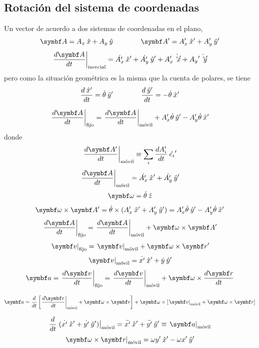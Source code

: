 \documentclass[10pt,oneside]{CBFT_book}
\begin{document}
\subsection{Rotación del sistema de coordenadas}

Un vector de acuerdo a dos sistemas de coordenadas en el plano,
\[
	\vb{A} = A_x\xver + A_y\yver \qquad \qquad \vb{A}' = A_x'\xver' + A_y'\yver'
\]
\[
	\left. \dtot{\vb{A}}{t} \right|_\text{inercial} = 
	\dot{A_x'}\xver' + \dot{A_y'}\yver' + A_x'\dot{\xver'} + A_y\dot{'\yver'}
\]
pero como la situación geométrica es la misma que la cuenta de polares, se tiene 
\[
	\frac{d^{\hspace{-0.05em}} {\:\hat{x}'}}{d {t}^{\hspace{-0.05em}}} = \dot{\theta} \:\hat{y}' \qquad \qquad 
	\frac{d^{\hspace{-0.05em}} {\:\hat{y}'}}{d {t}^{\hspace{-0.05em}}} = -\dot{\theta} \:\hat{x}'
\]

\[
	\left. \dtot{\vb{A}}{t} \right|_\text{fijo} = \left. \dtot{\vb{A}}{t} \right|_\text{móvil}
	+ A_x' \dot{\theta}\yver' - A_y'\dot{\theta}\xver'
\]
donde 
\[
	\left. \dtot{\vb{A}'}{t} \right|_\text{móvil} \equiv \sum_i \dtot{A_i'}{t} \: \hat{e_i}'
\]
\[
	\left. \dtot{\vb{A}}{t} \right|_\text{móvil} = \dot{A_x'}\xver' + \dot{A_y'}\yver'
\]
\[
	\vb{\omega} = \dot{\theta} \zver
\]
\[
	\vb{\omega}\times\vb{A}' = \dot{\theta} \times ({A_x'}\xver' + {A_y'}\yver') =
	A_x' \dot{\theta}\yver' - A_y'\dot{\theta}\xver'
\]
\[
	\left. \dtot{\vb{A}}{t} \right|_\text{fijo} = \left. \dtot{\vb{A}}{t} \right|_\text{móvil}
	+ \vb{\omega} \times \vb{A}'
\]
\[
	\left. \vb{v} \right|_\text{fijo} = \left. \vb{v} \right|_\text{móvil} + \vb{\omega} \times \vb{r}'
\]
\[
	\left. \vb{v} \right|_\text{móvil} = \dot{x'}\xver' + \dot{y}\yver' 
\]
\[
	\vb{a} = \left. \dtot{\vb{v}}{t} \right|_\text{fijo} = \left. \dtot{\vb{v}}{t} \right|_\text{móvil} +
	\vb{\omega} \times \dtot{\vb{r}}{t}
\]

\[
	\vb{a} = \dtot{}{t}\left[ \left. \dtot{\vb{r}}{t} \right|_\text{móvil} + \vb{\omega}\times\vb{r} \right] +
	\vb{\omega} \times \left[ \left. \vb{v} \right|_\text{móvil} +	\vb{\omega}\times\vb{r} \right]
\]

\[
	\dtot{}{t}\left.( \dot{x'}\xver' + \dot{y'}\yver' )\right|_\text{móvil} = 
	\ddot{x'}\xver' + \ddot{y'}\yver' \equiv \left. \vb{a} \right|_\text{móvil}
\]
\[
	\left.\vb{\omega}\times\vb{r}\right|_\text{móvil} = \omega y' \xver' - \omega x' \yver'
\]
\end{document}
